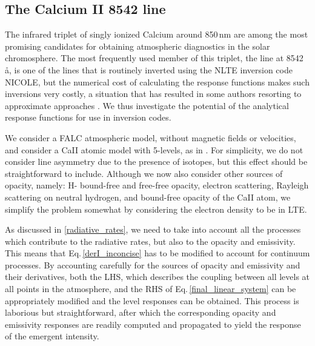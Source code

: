 \documentclass[referee]{aa}
\begin{document}
\subsection{The Calcium II 8542 line}
\label{CaII}

The infrared triplet of singly ionized Calcium around 850\,nm are among the most promising candidates for obtaining atmospheric diagnostics \citep[see][for an in depth discussion of response function and diagnostic capabilities]{Ca_diag_Jaime} in the solar chromosphere. The most frequently used member of this triplet, the line at 8542\,\aa, is one of the lines that is routinely inverted using the NLTE inversion code NICOLE, but the numerical cost of calculating the response functions makes such inversions very costly, a situation that has resulted in some authors resorting to approximate approaches \citep{Beck_inversion_2015}. We thus investigate the potential of the analytical response functions for use in inversion codes.

We consider a FALC atmospheric model, without magnetic fields or velocities, and consider a CaII atomic model with 5-levels, as in \citet{Ca_diag_Jaime}. For simplicity, we do not consider line asymmetry due to the presence of isotopes, but this effect should be straightforward to include. Although we now also consider other sources of opacity, namely: H- bound-free and free-free opacity, electron scattering, Rayleigh scattering on neutral hydrogen, and bound-free opacity of the CaII atom, we simplify the problem somewhat by considering the electron density to be in LTE. 

As discussed in \ref{radiative_rates}, we need to take into account all the processes which contribute to the radiative rates, but also to the opacity and emissivity. This means that Eq.\,\ref{derI_inconcise} has to be modified to account for continuum processes. By accounting carefully for the sources of opacity and emissivity and their derivatives, both the LHS, which describes the coupling between all levels at all points in the atmosphere, and the RHS of Eq.\,\ref{final_linear_system} can be appropriately modified and the level responses can be obtained. This process is laborious but straightforward, after which the corresponding opacity and emissivity responses are readily computed and propagated to yield the response of the emergent intensity.
\end{document}
